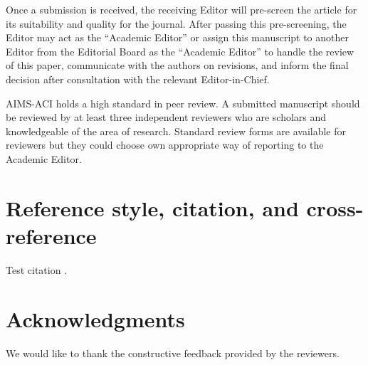 \documentclass{aci}
\begin{document}
Once a submission is received, the receiving Editor will pre-screen the article
for its suitability and quality for the journal. After passing this
pre-screening, the Editor may act as the “Academic Editor” or assign this
manuscript to another Editor from the Editorial Board as the “Academic Editor”
to handle the review of this paper, communicate with the authors on revisions,
and inform the final decision after consultation with the relevant
Editor-in-Chief.

AIMS-ACI holds a high standard in peer review. A submitted manuscript should be
reviewed by at least three independent reviewers who are scholars and
knowledgeable of the area of research. Standard review forms are available for
reviewers but they could choose own appropriate way of reporting to the Academic
Editor.


\section{Reference style, citation, and cross-reference}
Test citation \cite{Jensen1996}.


\section*{Acknowledgments}
We would like to thank the constructive feedback provided by the reviewers.





\end{document}

